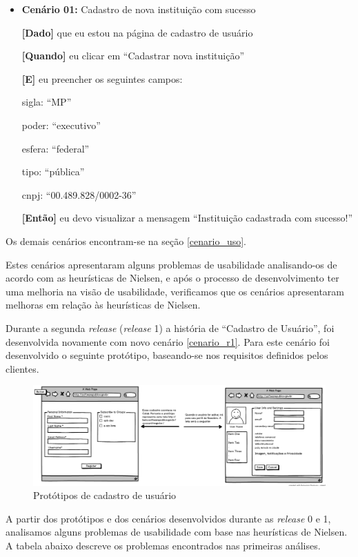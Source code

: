 \begin{itemize}
\item\textbf{Cenário 01:} Cadastro de nova instituição com sucesso

\textbf{[Dado]} que eu estou na página de cadastro de usuário

\textbf{[Quando]} eu clicar em ``Cadastrar nova instituição''

\textbf{[E]} eu preencher os seguintes campos:

  	\subitem sigla: ``MP''

  	\subitem poder: ``executivo''

  	\subitem esfera: ``federal''

  	\subitem tipo: ``pública''

  	\subitem cnpj: ``00.489.828/0002-36''

\textbf{[Então]} eu devo visualizar a mensagem ``Instituição cadastrada com sucesso!''
\end{itemize}
Os demais cenários encontram-se na seção \ref{cenario_uso}. 

Estes cenários apresentaram alguns problemas de usabilidade analisando-os de acordo com as heurísticas de Nielsen, e após o processo de desenvolvimento ter uma melhoria na visão de usabilidade, verificamos que os cenários apresentaram melhoras em relação às heurísticas de Nielsen. 

Durante a segunda \textit{release} (\textit{release} 1) a história de ``Cadastro de Usuário'', foi desenvolvida novamente com novo cenário \ref{cenario_r1}. Para este cenário foi desenvolvido o seguinte protótipo, baseando-se nos requisitos definidos pelos clientes. 

	\begin{figure}[h!]
    	\centering
    	\includegraphics[keepaspectratio=true,scale=0.3]
      		{figuras/CadastroEdicaoUser.eps}
    	\caption{Protótipos de cadastro de usuário}
    	\label{cadastro user}
	\end{figure}

A partir dos protótipos e dos cenários desenvolvidos durante as \textit{release} 0 e 1, analisamos alguns problemas de usabilidade com base nas heurísticas de Nielsen. A tabela abaixo descreve os problemas encontrados nas primeiras análises.

